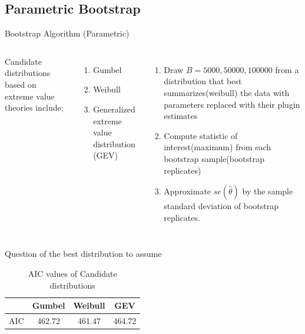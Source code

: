 \documentclass[a4paper,9pt]{beamer}\usepackage[]{graphicx}\usepackage[]{color}
\begin{document}
\subsection{Parametric Bootstrap}
\begin{frame}{Bootstrap Algorithm (Parametric)}
\begin{columns}
Candidate distributions based on extreme value theories include;
\begin{enumerate}[i]
\item Gumbel
\item Weibull
\item Generalized extreme value distribution (GEV)
\end{enumerate}

\begin{enumerate}[i]
\item Draw $B=5000, 50000, 100000$ from a \alert{distribution that best summarizes(weibull)} the data with parameters replaced with their plugin estimates
\item Compute statistic of interest(maximum) from each bootstrap sample(bootstrap replicates)
\item Approximate $se(\hat{\theta})$ by the sample standard deviation of bootstrap replicates.
\end{enumerate}
\end{columns}

\alert{Question of the best distribution to assume}
\begin{table}[h]
\begin{tabular}{cccc}
\hline
& Gumbel & \alert{Weibull} & GEV\\
\hline
AIC & 462.72 & \alert{461.47} & 464.72\\
\hline
\end{tabular}
\caption{AIC values of Candidate distributions}
\end{table}

\end{frame}
\end{document}
